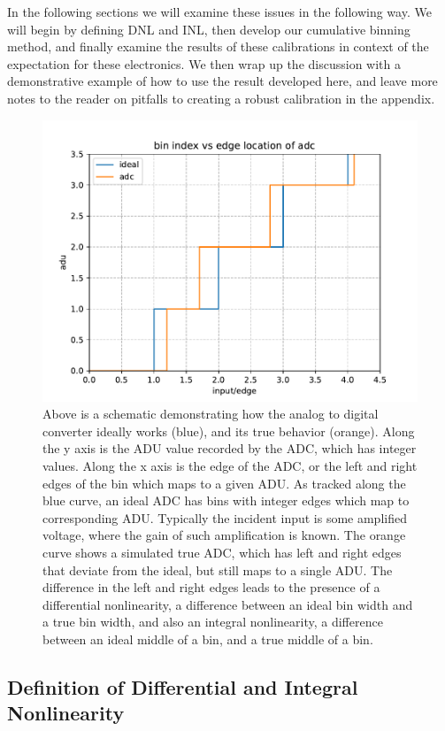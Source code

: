 \documentclass[11pt, letterpaper]{article}
\begin{document}
\indent 
In the following sections we will examine these issues in the following way.
We will begin by defining DNL and INL, then develop our cumulative binning method, and finally examine the results of these calibrations in context of the expectation for these electronics. 
We then wrap up the discussion with a demonstrative example of how to use the result developed here, and leave more notes to the reader on pitfalls to creating a robust calibration in the appendix. 

\begin{figure}
    \centering
    \includegraphics[width=0.5\linewidth]{dnlinlex.pdf}
    \caption{Above is a schematic demonstrating how the analog to digital converter ideally works (blue), and its true behavior (orange). Along the y axis is the ADU value recorded by the ADC, which has integer values. Along the x axis is the edge of the ADC, or the left and right edges of the bin which maps to a given ADU. As tracked along the blue curve, an ideal ADC has bins with integer edges which map to corresponding ADU. Typically the incident input is some amplified voltage, where the gain of such amplification is known. The orange curve shows a simulated true ADC, which has left and right edges that deviate from the ideal, but still maps to a single ADU. The difference in the left and right edges leads to the presence of a differential nonlinearity, a difference between an ideal bin width and a true bin width, and also an integral nonlinearity, a difference between an ideal middle of a bin, and a true middle of a bin.}
    \label{fig:idealADC}
\end{figure}

\subsection{Definition of Differential and Integral Nonlinearity}
\label{sec: DNL_INL_Def}
\indent 
\end{document}
